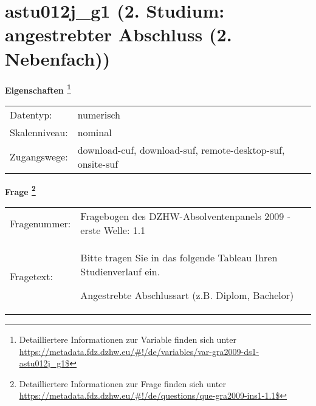 
    \setcounter{footnote}{0}

    \vspace*{-1.8cm}
	\section{astu012j\_g1 (2. Studium: angestrebter Abschluss (2. Nebenfach))}
	\label{section:astu012j_g1}



    \vspace*{0.5cm}
    \noindent\textbf{Eigenschaften
	\footnote{Detailliertere Informationen zur Variable finden sich unter
		\url{https://metadata.fdz.dzhw.eu/\#!/de/variables/var-gra2009-ds1-astu012j_g1$}}}\\
	\begin{tabularx}{\hsize}{@{}lX}
	Datentyp: & numerisch \\
	Skalenniveau: & nominal \\
	Zugangswege: &
	  download-cuf, 
	  download-suf, 
	  remote-desktop-suf, 
	  onsite-suf
 \\
    \end{tabularx}



				\vspace*{0.5cm}
                \noindent\textbf{Frage
	                \footnote{Detailliertere Informationen zur Frage finden sich unter
		              \url{https://metadata.fdz.dzhw.eu/\#!/de/questions/que-gra2009-ins1-1.1$}}}\\
				\begin{tabularx}{\hsize}{@{}lX}
					Fragenummer: &
					  Fragebogen des DZHW-Absolventenpanels 2009 - erste Welle:
					  1.1
 \\
					Fragetext: & Bitte tragen Sie in das folgende Tableau Ihren Studienverlauf ein.\par  Angestrebte Abschlussart (z.B. Diplom, Bachelor) \\
				\end{tabularx}





